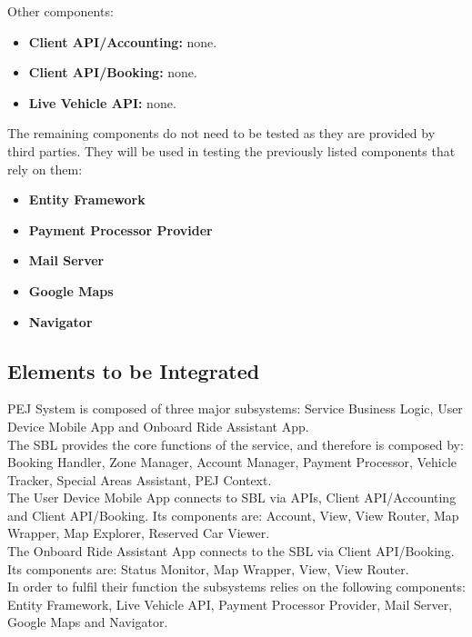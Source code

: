 Other components:
\begin{itemize}
    \item \textbf{Client API/Accounting:} none.
    \item \textbf{Client API/Booking:} none.
    \item \textbf{Live Vehicle API:} none.
\end{itemize}
The remaining components do not need to be tested as they are provided by third parties. They will be used in testing the previously listed components that rely on them:
\begin{itemize}
    \item \textbf{Entity Framework}
    \item \textbf{Payment Processor Provider}
    \item \textbf{Mail Server}
    \item \textbf{Google Maps}
    \item \textbf{Navigator}
\end{itemize}

\subsection{Elements to be Integrated}
PEJ System is composed of three major subsystems: Service Business Logic, User Device Mobile App and Onboard Ride Assistant App.\\
The SBL provides the core functions of the service, and therefore is composed by: Booking Handler, Zone Manager, Account Manager, Payment Processor, Vehicle Tracker, Special Areas Assistant, PEJ Context.\\
The User Device Mobile App connects to SBL via APIs, Client API/Accounting and Client API/Booking. Its components are: Account, View, View Router, Map Wrapper, Map Explorer, Reserved Car Viewer.\\
The Onboard Ride Assistant App connects to the SBL via Client API/Booking. Its components are: Status Monitor, Map Wrapper, View, View Router.\\
In order to fulfil their function the subsystems relies on the following components: Entity Framework, Live Vehicle API, Payment Processor Provider, Mail Server, Google Maps and Navigator.


